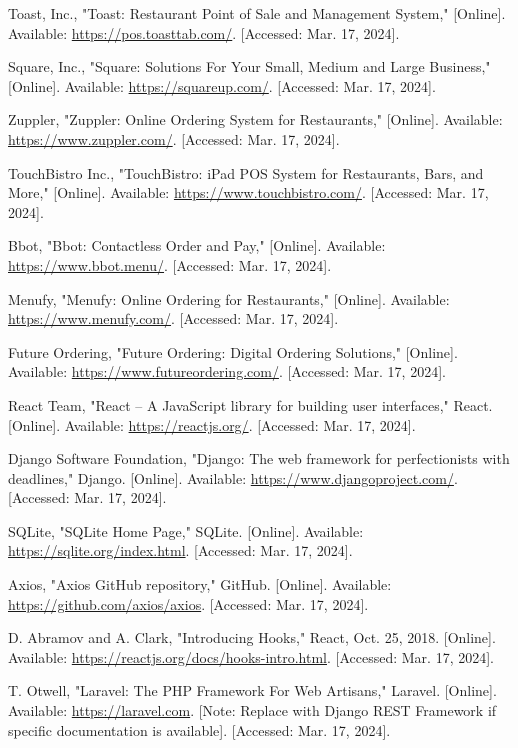 \documentclass{report}
\begin{document}
\begin{thebibliography}{}
     Toast, Inc., "Toast: Restaurant Point of Sale and Management System," [Online]. Available: \url{https://pos.toasttab.com/}. [Accessed: Mar. 17, 2024].

     Square, Inc., "Square: Solutions For Your Small, Medium and Large Business," [Online]. Available: \url{https://squareup.com/}. [Accessed: Mar. 17, 2024].

     Zuppler, "Zuppler: Online Ordering System for Restaurants," [Online]. Available: \url{https://www.zuppler.com/}. [Accessed: Mar. 17, 2024].

     TouchBistro Inc., "TouchBistro: iPad POS System for Restaurants, Bars, and More," [Online]. Available: \url{https://www.touchbistro.com/}. [Accessed: Mar. 17, 2024].

     Bbot, "Bbot: Contactless Order and Pay," [Online]. Available: \url{https://www.bbot.menu/}. [Accessed: Mar. 17, 2024].

     Menufy, "Menufy: Online Ordering for Restaurants," [Online]. Available: \url{https://www.menufy.com/}. [Accessed: Mar. 17, 2024].

     Future Ordering, "Future Ordering: Digital Ordering Solutions," [Online]. Available: \url{https://www.futureordering.com/}. [Accessed: Mar. 17, 2024].

     React Team, "React – A JavaScript library for building user interfaces," React. [Online]. Available: \url{https://reactjs.org/}. [Accessed: Mar. 17, 2024].

     Django Software Foundation, "Django: The web framework for perfectionists with deadlines," Django. [Online]. Available: \url{https://www.djangoproject.com/}. [Accessed: Mar. 17, 2024].

     SQLite, "SQLite Home Page," SQLite. [Online]. Available: \url{https://sqlite.org/index.html}. [Accessed: Mar. 17, 2024].

     Axios, "Axios GitHub repository," GitHub. [Online]. Available: \url{https://github.com/axios/axios}. [Accessed: Mar. 17, 2024].

     D. Abramov and A. Clark, "Introducing Hooks," React, Oct. 25, 2018. [Online]. Available: \url{https://reactjs.org/docs/hooks-intro.html}. [Accessed: Mar. 17, 2024].

     T. Otwell, "Laravel: The PHP Framework For Web Artisans," Laravel. [Online]. Available: \url{https://laravel.com}. [Note: Replace with Django REST Framework if specific documentation is available]. [Accessed: Mar. 17, 2024].


\end{thebibliography}
\end{document}
